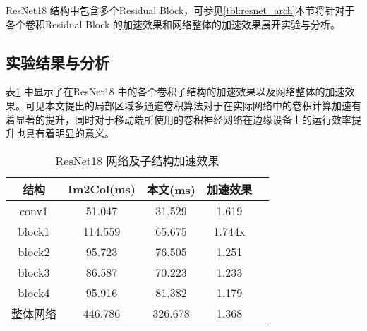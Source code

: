 ResNet18 结构中包含多个Residual Block，可参见\ref{tbl:resnet_arch}本节将针对于各个卷积Residual Block 的加速效果和网络整体的加速效果展开实验与分析。

\subsection{实验结果与分析}

表\ref{tbl:conv_speedup} 中显示了在ResNet18 中的各个卷积子结构的加速效果以及网络整体的加速效果。可见本文提出的局部区域多通道卷积算法对于在实际网络中的卷积计算加速有着显著的提升，同时对于移动端所使用的卷积神经网络在边缘设备上的运行效率提升也具有着明显的意义。


\begin{table}[]
\centering
\caption{ResNet18 网络及子结构加速效果}
\begin{tabular}{ccccc}
  \toprule
  结构   & Im2Col(ms) & 本文(ms) & 加速效果 \\
  \midrule
  conv1  & 51.047  & 31.529 & 1.619 \\
  block1  &  114.559 & 65.675 & 1.744x \\
  block2  & 95.723 & 76.505 & 1.251 \\
  block3  & 86.587 & 70.223 & 1.233 \\
  block4 & 95.916 & 81.382 & 1.179 \\
  整体网络& 446.786 & 326.678  & 1.368 \\
  \bottomrule
\end{tabular}
\label{tbl:conv_speedup}
\end{table}
\iffalse
\section{实验验证}

这一部分验证本文中实现的整数Winograd 快速卷积在嵌入式设备上的有效性，
包括
\begin{itemize}
  \item 针对单个卷积操作本身的执行效率，测量不同尺度规模的卷积输入下
    \begin{itemize}
        \item 该卷积实现同对应的全精度Winograd快速卷积的加速效果, 包括执行效率和内存开销(对照组为NNPACK实现)
        \item 该卷积实现同基于GEMM卷积方法的整数卷积效率对比(对照组为QNNPACK实现)
    \end{itemize}
  \item 针对于由此卷积操作构成的卷积网络在特定的视觉任务上的的执行性能和效率
    \begin{itemize}
        \item 同全精度网络的执行效率和准确率作对比加速效果存储开销和数值精度
        \item 同支持量化卷积计算的模型推理框架（TensorFlow lite， PyTorch Mobile）对比实现的准确率与加速效果
    \end{itemize}

\end{itemize}
\fi
